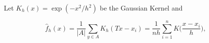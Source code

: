 Let  $K_h(x) = \exp( -x^2/h^2)$ be the Gaussian Kernel and

\[
    \hat{f}_h(x) = \frac{1}{|A|}\sum_{ y \in A} K_h (Tx - x_i) = \frac{1}{nh} \sum_{i=1}^n K\Big(\frac{x-x_i}{h}\Big),
  \]